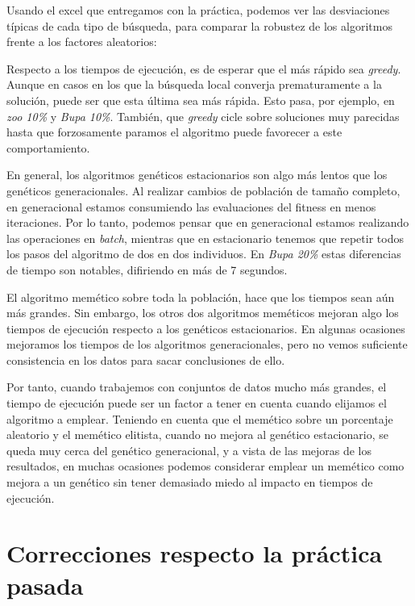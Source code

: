 \documentclass[11pt]{article}
\begin{document}
Usando el excel que entregamos con la práctica, podemos ver las desviaciones típicas de cada tipo de búsqueda, para comparar la robustez de los algoritmos frente a los factores aleatorios:


Respecto a los tiempos de ejecución, es de esperar que el más rápido sea \emph{greedy}. Aunque en casos en los que la búsqueda local converja prematuramente a la solución, puede ser que esta última sea más rápida. Esto pasa, por ejemplo, en \emph{zoo 10\%} y \emph{Bupa 10\%}. También, que \emph{greedy} cicle sobre soluciones muy parecidas hasta que forzosamente paramos el algoritmo puede favorecer a este comportamiento.

En general, los algoritmos genéticos estacionarios son algo más lentos que los genéticos generacionales. Al realizar cambios de población de tamaño completo, en generacional estamos consumiendo las evaluaciones del fitness en menos iteraciones. Por lo tanto, podemos pensar que en generacional estamos realizando las operaciones en \emph{batch}, mientras que en estacionario tenemos que repetir todos los pasos del algoritmo de dos en dos individuos. En \emph{Bupa 20\%} estas diferencias de tiempo son notables, difiriendo en más de 7 segundos.

El algoritmo memético sobre toda la población, hace que los tiempos sean aún más grandes. Sin embargo, los otros dos algoritmos meméticos mejoran algo los tiempos de ejecución respecto a los genéticos estacionarios. En algunas ocasiones mejoramos los tiempos de los algoritmos generacionales, pero no vemos suficiente consistencia en los datos para sacar conclusiones de ello.

Por tanto, cuando trabajemos con conjuntos de datos mucho más grandes, el tiempo de ejecución puede ser un factor a tener en cuenta cuando elijamos el algoritmo a emplear. Teniendo en cuenta que el memético sobre un porcentaje aleatorio y el memético elitista, cuando no mejora al genético estacionario, se queda muy cerca del genético generacional, y a vista de las mejoras de los resultados, en muchas ocasiones podemos considerar emplear un memético como mejora a un genético sin tener demasiado miedo al impacto en tiempos de ejecución.






\pagebreak

\section{Correcciones respecto la práctica pasada} \label{seccion:correcciones}
\end{document}
